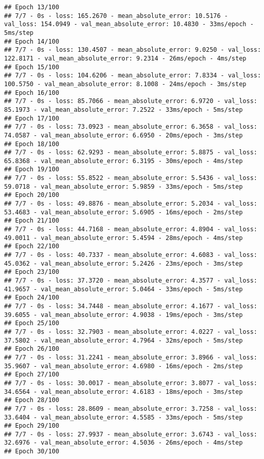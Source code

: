 \documentclass[
]{article}
\begin{document}
\begin{verbatim}
## Epoch 13/100
## 7/7 - 0s - loss: 165.2670 - mean_absolute_error: 10.5176 - val_loss: 154.0949 - val_mean_absolute_error: 10.4830 - 33ms/epoch - 5ms/step
## Epoch 14/100
## 7/7 - 0s - loss: 130.4507 - mean_absolute_error: 9.0250 - val_loss: 122.8171 - val_mean_absolute_error: 9.2314 - 26ms/epoch - 4ms/step
## Epoch 15/100
## 7/7 - 0s - loss: 104.6206 - mean_absolute_error: 7.8334 - val_loss: 100.5750 - val_mean_absolute_error: 8.1008 - 24ms/epoch - 3ms/step
## Epoch 16/100
## 7/7 - 0s - loss: 85.7066 - mean_absolute_error: 6.9720 - val_loss: 85.1973 - val_mean_absolute_error: 7.2522 - 33ms/epoch - 5ms/step
## Epoch 17/100
## 7/7 - 0s - loss: 73.0923 - mean_absolute_error: 6.3658 - val_loss: 74.0587 - val_mean_absolute_error: 6.6950 - 20ms/epoch - 3ms/step
## Epoch 18/100
## 7/7 - 0s - loss: 62.9293 - mean_absolute_error: 5.8875 - val_loss: 65.8368 - val_mean_absolute_error: 6.3195 - 30ms/epoch - 4ms/step
## Epoch 19/100
## 7/7 - 0s - loss: 55.8522 - mean_absolute_error: 5.5436 - val_loss: 59.0718 - val_mean_absolute_error: 5.9859 - 33ms/epoch - 5ms/step
## Epoch 20/100
## 7/7 - 0s - loss: 49.8876 - mean_absolute_error: 5.2034 - val_loss: 53.4683 - val_mean_absolute_error: 5.6905 - 16ms/epoch - 2ms/step
## Epoch 21/100
## 7/7 - 0s - loss: 44.7168 - mean_absolute_error: 4.8904 - val_loss: 49.0011 - val_mean_absolute_error: 5.4594 - 28ms/epoch - 4ms/step
## Epoch 22/100
## 7/7 - 0s - loss: 40.7337 - mean_absolute_error: 4.6083 - val_loss: 45.0362 - val_mean_absolute_error: 5.2426 - 23ms/epoch - 3ms/step
## Epoch 23/100
## 7/7 - 0s - loss: 37.3720 - mean_absolute_error: 4.3577 - val_loss: 41.9657 - val_mean_absolute_error: 5.0464 - 33ms/epoch - 5ms/step
## Epoch 24/100
## 7/7 - 0s - loss: 34.7448 - mean_absolute_error: 4.1677 - val_loss: 39.6055 - val_mean_absolute_error: 4.9038 - 19ms/epoch - 3ms/step
## Epoch 25/100
## 7/7 - 0s - loss: 32.7903 - mean_absolute_error: 4.0227 - val_loss: 37.5802 - val_mean_absolute_error: 4.7964 - 32ms/epoch - 5ms/step
## Epoch 26/100
## 7/7 - 0s - loss: 31.2241 - mean_absolute_error: 3.8966 - val_loss: 35.9607 - val_mean_absolute_error: 4.6980 - 16ms/epoch - 2ms/step
## Epoch 27/100
## 7/7 - 0s - loss: 30.0017 - mean_absolute_error: 3.8077 - val_loss: 34.6564 - val_mean_absolute_error: 4.6183 - 18ms/epoch - 3ms/step
## Epoch 28/100
## 7/7 - 0s - loss: 28.8609 - mean_absolute_error: 3.7258 - val_loss: 33.6404 - val_mean_absolute_error: 4.5585 - 33ms/epoch - 5ms/step
## Epoch 29/100
## 7/7 - 0s - loss: 27.9937 - mean_absolute_error: 3.6743 - val_loss: 32.6976 - val_mean_absolute_error: 4.5036 - 26ms/epoch - 4ms/step
## Epoch 30/100

\end{verbatim}
\end{document}
